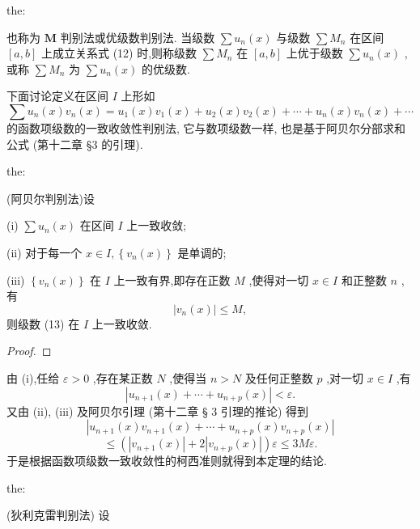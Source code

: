 \begin{theorem}{}{the:}

\end{theorem}
 也称为 \(\mathbf{M}\) 判别法或优级数判别法. 当级数 \(\sum {u}_{n}\left( x\right)\) 与级数 \(\sum {M}_{n}\) 在区间 \(\left\lbrack  {a,b}\right\rbrack\) 上成立关系式 (12) 时,则称级数 \(\sum {M}_{n}\) 在 \(\left\lbrack  {a,b}\right\rbrack\) 上优于级数 \(\sum {u}_{n}\left( x\right)\) ,或称 \(\sum {M}_{n}\) 为 \(\sum {u}_{n}\left( x\right)\) 的优级数.

下面讨论定义在区间 \(I\) 上形如
\[
\sum {u}_{n}\left( x\right) {v}_{n}\left( x\right)  = {u}_{1}\left( x\right) {v}_{1}\left( x\right)  + {u}_{2}\left( x\right) {v}_{2}\left( x\right)  + \cdots  + {u}_{n}\left( x\right) {v}_{n}\left( x\right)  + \cdots  \tag{13}
\]
的函数项级数的一致收敛性判别法, 它与数项级数一样, 也是基于阿贝尔分部求和公式 (第十二章 §3 的引理).

\begin{theorem}{}{the:}

\end{theorem}
(阿贝尔判别法)设

(i) \(\sum {u}_{n}\left( x\right)\) 在区间 \(I\) 上一致收敛;

(ii) 对于每一个 \(x \in  I,\left\{  {{v}_{n}\left( x\right) }\right\}\) 是单调的;

(iii) \(\left\{  {{v}_{n}\left( x\right) }\right\}\) 在 \(I\) 上一致有界,即存在正数 \(M\) ,使得对一切 \(x \in  I\) 和正整数 \(n\) ,有
\[
\left| {{v}_{n}\left( x\right) }\right|  \leq  M,
\]
则级数 (13) 在 \(I\) 上一致收敛.

\begin{proof}

\end{proof}
由 (i),任给 \(\varepsilon  > 0\) ,存在某正数 \(N\) ,使得当 \(n > N\) 及任何正整数 \(p\) ,对一切 \(x \in  I\) ,有
\[
\left| {{u}_{n + 1}\left( x\right)  + \cdots  + {u}_{n + p}\left( x\right) }\right|  < \varepsilon .
\]
又由 (ii), (iii) 及阿贝尔引理 (第十二章 § 3 引理的推论) 得到
\[
\left| {{u}_{n + 1}\left( x\right) {v}_{n + 1}\left( x\right)  + \cdots  + {u}_{n + p}\left( x\right) {v}_{n + p}\left( x\right) }\right|
\]
\[
\leq  \left( {\left| {{v}_{n + 1}\left( x\right) }\right|  + 2\left| {{v}_{n + p}\left( x\right) }\right| }\right) \varepsilon  \leq  {3M\varepsilon }.
\]
于是根据函数项级数一致收敛性的柯西准则就得到本定理的结论.

\begin{theorem}{}{the:}

\end{theorem}
(狄利克雷判别法) 设

